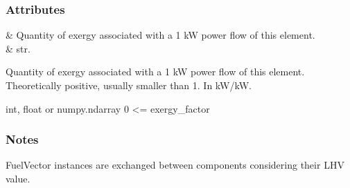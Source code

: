 \documentclass[letterpaper,10pt,english]{sphinxmanual}
\begin{document}
\begin{fulllineitems}
\subsubsection*{Attributes}


\begin{savenotes}\sphinxattablestart
\centering
\begin{tabulary}{\linewidth}[t]{}
\hline

\sphinxAtStartPar
{\hyperref[\detokenize{generated/tamos.element.ElectricityVector:tamos.element.ElectricityVector.exergy_factor}]{}}
&
\sphinxAtStartPar
Quantity of exergy associated with a 1 kW power flow of this element.
\\
\hline
\sphinxAtStartPar
{\hyperref[\detokenize{generated/tamos.element.ElectricityVector:tamos.element.ElectricityVector.name}]{}}
&
\sphinxAtStartPar
str.
\\
\hline
\end{tabulary}
\par
\sphinxattableend\end{savenotes}

\begin{fulllineitems}
\label{\detokenize{generated/tamos.element.ElectricityVector:tamos.element.ElectricityVector.exergy_factor}}
\pysigstartsignatures
{}
\pysigstopsignatures
\sphinxAtStartPar
Quantity of exergy associated with a 1 kW power flow of this element.
Theoretically positive, usually smaller than 1. In kW/kW.

\sphinxAtStartPar
int, float or numpy.ndarray
0 \textless{}= exergy\_factor
\subsubsection*{Notes}

\sphinxAtStartPar
FuelVector instances are exchanged between components considering their LHV value.

\end{fulllineitems}



\end{fulllineitems}
\end{document}
